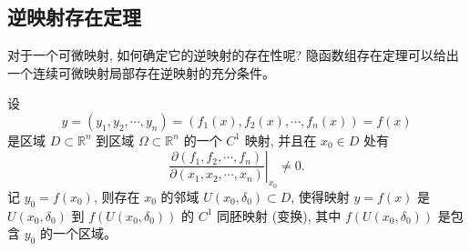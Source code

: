 \documentclass[12pt,fontset=fandol]{ctexart}
\begin{document}
\subsection{逆映射存在定理}

对于一个可微映射, 如何确定它的逆映射的存在性呢? 隐函数组存在定理可以给出一个连续可微映射局部存在逆映射的充分条件。

\begin{theorem}[逆映射存在定理]\label{course-theorem-14-4-4}\quad 设
\[
  y=(y_1,y_2,\cdots,y_n)=(f_1(x),f_2(x),\cdots,f_n(x))=f(x)
\]
是区域 $D\subset\mathbb R^n$ 到区域 $\Omega\subset\mathbb R^n$ 的一个 $C^1$ 映射, 并且在 $x_0\in D$ 处有
\[
  \left.
  \frac{\partial(f_1,f_2,\cdots,f_n)}
       {\partial(x_1,x_2,\cdots,x_n)}
  \right|_{x_0}
  \ne0.
\]
记 $y_0=f(x_0)$, 则存在 $x_0$ 的邻域 $U(x_0,\delta_0)\subset D$, 使得映射 $y=f(x)$ 是 $U(x_0,\delta_0)$ 到 $f(U(x_0,\delta_0))$ 的 $C^1$ 同胚映射 (变换), 其中 $f(U(x_0,\delta_0))$ 是包含 $y_0$ 的一个区域。

\end{theorem}
\end{document}
